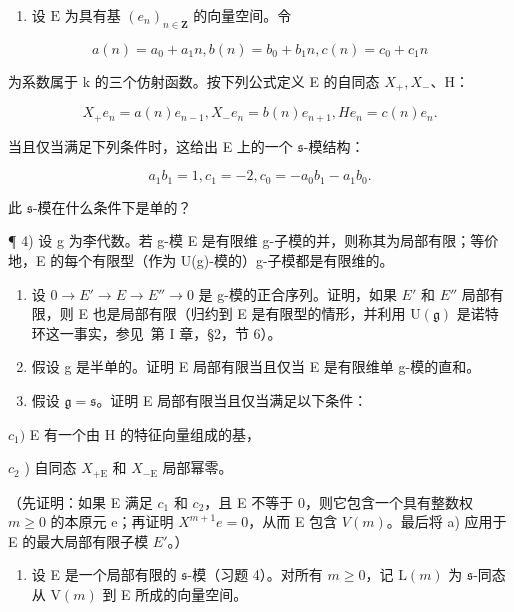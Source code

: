 \begin{enumerate}
\def\labelenumi{\arabic{enumi})}
\setcounter{enumi}{2}
\tightlist
\item
  设 \(\mathrm{E}\) 为具有基 \((e_n)_{n\in \mathbf{Z}}\) 的向量空间。令
\end{enumerate}

\[
a (n) = a _ {0} + a _ {1} n, b (n) = b _ {0} + b _ {1} n, c (n) = c _ {0} + c _ {1} n
\]

为系数属于 k 的三个仿射函数。按下列公式定义 E 的自同态 \(X_{+}, X_{-}\)、H：

\[
X _ {+} e _ {n} = a (n) e _ {n - 1}, X _ {-} e _ {n} = b (n) e _ {n + 1}, H e _ {n} = c (n) e _ {n}.
\]

当且仅当满足下列条件时，这给出 E 上的一个 \(\mathfrak{s}\)-模结构：

\[
a _ {1} b _ {1} = 1, c _ {1} = - 2, c _ {0} = - a _ {0} b _ {1} - a _ {1} b _ {0}.
\]

此 \(\mathfrak{s}\)-模在什么条件下是单的？

¶ 4) 设 g 为李代数。若 g-模 E 是有限维 g-子模的并，则称其为局部有限；等价地，E 的每个有限型（作为 U(g)-模的）g-子模都是有限维的。

\begin{enumerate}
\def\labelenumi{\alph{enumi})}
\item
  设 \(0 \rightarrow E' \rightarrow E \rightarrow E'' \rightarrow 0\) 是 g-模的正合序列。证明，如果 \(E'\) 和 \(E''\) 局部有限，则 E 也是局部有限（归约到 E 是有限型的情形，并利用 \(\mathrm{U}(\mathfrak{g})\) 是诺特环这一事实，参见~第 I 章，§2，节 6）。
\item
  假设 g 是半单的。证明 E 局部有限当且仅当 E 是有限维单 g-模的直和。
\item
  假设 \(\mathfrak{g} = \mathfrak{s}\)。证明 E 局部有限当且仅当满足以下条件：
\end{enumerate}

\(c_{1})\) E 有一个由 H 的特征向量组成的基，

\(c_{2}\) ) 自同态 \(X_{+\mathrm{E}}\) 和 \(X_{-\mathrm{E}}\) 局部幂零。

（先证明：如果 E 满足 \(c_{1}\) 和 \(c_{2}\)，且 E 不等于 0，则它包含一个具有整数权 \(m \geq 0\) 的本原元 e；再证明 \(X^{m+1}e = 0\)，从而 E 包含 \(V(m)\)。最后将 a) 应用于 E 的最大局部有限子模 \(E'\)。）

\begin{enumerate}
\def\labelenumi{\arabic{enumi})}
\setcounter{enumi}{4}
\tightlist
\item
  设 E 是一个局部有限的 \(\mathfrak{s}\)-模（习题 4）。对所有 \(m \geq 0\)，记 \(\mathrm{L}(m)\) 为 \(\mathfrak{s}\)-同态从 \(\mathrm{V}(m)\) 到 E 所成的向量空间。
\end{enumerate}


